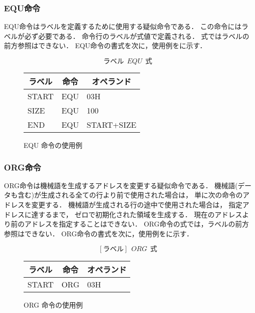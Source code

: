 \subsubsection{EQU命令}
EQU命令はラベルを定義するために使用する疑似命令である．
この命令にはラベルが必ず必要である．
命令行のラベルが式値で定義される．
式ではラベルの前方参照はできない．
EQU命令の書式を次に，使用例をに示す．

{\small\[ ラベル~~EQU~~式 \]}

\begin{figure}[btp]
\begin{center}
{\tt\small\begin{tabular}{|l|l|l|}\hline
\multicolumn{1}{|c|}{ラベル} & 
        \multicolumn{1}{c|}{命令} & \multicolumn{1}{c|}{オペランド} \\\hline
START & EQU & 03H \\
SIZE  & EQU & 100 \\
END   & EQU & START+SIZE \\\hline
\end{tabular}}
\caption{EQU 命令の使用例}
\label{fig:appB:equ}
\end{center}
\end{figure}

\subsubsection{ORG命令}
ORG命令は機械語を生成するアドレスを変更する疑似命令である．
機械語(データも含む)が生成される全ての行より前で使用された場合は，
単に次の命令のアドレスを変更する．
機械語が生成される行の途中で使用された場合は，
指定アドレスに達するまで，
ゼロで初期化された領域を生成する．
現在のアドレスより前のアドレスを指定することはできない．
ORG命令の式では，ラベルの前方参照はできない．
ORG命令の書式を次に，使用例をに示す．

{\small\[ [ラベル]~~ORG~~式\]}

\begin{figure}[btp]
\begin{center}
{\tt\small\begin{tabular}{|l|l|l|}\hline
\multicolumn{1}{|c|}{ラベル} & 
        \multicolumn{1}{c|}{命令} & \multicolumn{1}{c|}{オペランド} \\\hline
START & ORG & 03H \\\hline
\end{tabular}}
\caption{ORG 命令の使用例}
\label{fig:appB:org}
\end{center}
\end{figure}

